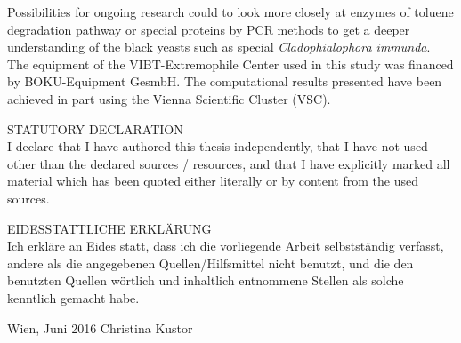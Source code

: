 \documentclass[12pt, a4paper]{report}
\begin{document}
Possibilities for ongoing research could to look more closely at enzymes of toluene degradation pathway or special proteins by PCR methods to get a deeper understanding of the black yeasts such as special \textit{Cladophialophora immunda}.\\
 

\newpage
The equipment of the VIBT-Extremophile Center used in this study was financed by BOKU-Equipment GesmbH. The computational results presented have been achieved in part using the Vienna Scientific Cluster (VSC). \\
\newpage
%
%

\newpage
\listoffigures
{}
\newpage
\listoftables
{}
\newpage
\vspace{2cm}

STATUTORY DECLARATION\\
I declare that I have authored this thesis independently, that I have not used
other than the declared sources / resources, and that I have explicitly marked
all material which has been quoted either literally or by content from the used
sources.\\
\vspace{1cm}

EIDESSTATTLICHE ERKLÄRUNG\\
Ich erkläre an Eides statt, dass ich die vorliegende Arbeit selbstständig verfasst,
andere als die angegebenen Quellen/Hilfsmittel nicht benutzt, und die
den benutzten Quellen wörtlich und inhaltlich entnommene Stellen als solche
kenntlich gemacht habe.\\
\vspace{3cm}


Wien, Juni 2016  \hspace*{6cm} Christina Kustor
\end{document}
